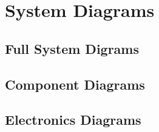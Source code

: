 
\section{System Diagrams}
\label{sec:system_diagrams}


\subsection{Full System Digrams}
\label{sec:full_sys_diagrams}

\subsection{Component Diagrams}
\label{sec:component_diagrams}

\subsection{Electronics Diagrams}
\label{sec:electronics_diagrams}
